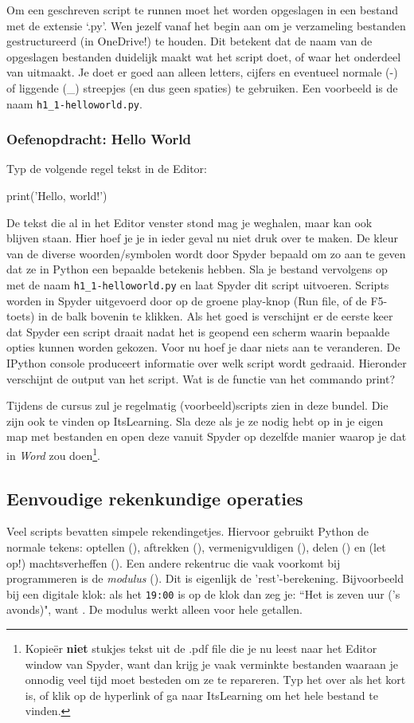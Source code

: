 \documentclass[a4paper,11pt, fleqn]{article}
\begin{document}
Om een geschreven script te runnen moet het worden opgeslagen in een bestand met de extensie `.py'. Wen jezelf vanaf het begin aan om je verzameling bestanden gestructureerd (in OneDrive!) te houden. Dit betekent dat de naam van de opgeslagen bestanden duidelijk maakt wat het script doet, of waar het onderdeel van uitmaakt. Je doet er goed aan alleen letters, cijfers en eventueel normale (-) of liggende (\_) streepjes (en dus geen spaties) te gebruiken. Een voorbeeld is de naam \verb,h1_1-helloworld.py,.

\subsubsection*{Oefenopdracht: Hello World} 
Typ de volgende regel tekst in de Editor: 
\begin{python}
print('Hello, world!')
\end{python}
De tekst die al in het Editor venster stond mag je weghalen, maar kan ook blijven staan. Hier hoef je je in ieder geval nu niet druk over te maken. De kleur van de diverse woorden/symbolen wordt door Spyder bepaald om zo aan te geven dat ze in Python een bepaalde betekenis hebben.
Sla je bestand vervolgens op met de naam \verb,h1_1-helloworld.py, en laat Spyder dit script uitvoeren. 
Scripts worden in Spyder uitgevoerd door op de groene play-knop (Run file, of de F5-toets) in de balk bovenin te klikken.
Als het goed is verschijnt er de eerste keer dat Spyder een script draait nadat het is geopend een scherm waarin bepaalde opties kunnen worden gekozen. Voor nu hoef je daar niets aan te veranderen. De IPython console produceert informatie over welk script wordt gedraaid. Hieronder verschijnt de output van het script. 
Wat is de functie van het commando print?

Tijdens de cursus zul je regelmatig (voorbeeld)scripts zien in deze bundel. Die zijn ook te vinden op ItsLearning. 
Sla deze als je ze nodig hebt op in je eigen map met bestanden en open deze vanuit Spyder op dezelfde manier waarop je dat in \textit{Word} zou doen\footnote{Kopie\"{e}r \textbf{niet} stukjes tekst uit de .pdf file die je nu leest naar het Editor window van Spyder, want dan krijg je vaak verminkte bestanden waaraan je onnodig veel tijd moet besteden om ze te repareren. Typ het over als het kort is, of klik op de hyperlink of ga naar ItsLearning om het hele bestand te vinden.}.

\subsection{Eenvoudige rekenkundige operaties}
Veel scripts bevatten simpele rekendingetjes. Hiervoor gebruikt Python de normale tekens: optellen (\pythoninline{+}), aftrekken (\pythoninline{-}), vermenigvuldigen (\pythoninline{*}), delen (\pythoninline{/}) en (let op!) machtsverheffen (\pythoninline{**}). Een andere rekentruc die vaak voorkomt bij programmeren is de \textit{modulus} (\pythoninline{\%}). Dit is eigenlijk de 'rest'-berekening. Bijvoorbeeld bij een digitale klok: als het \verb,19:00, is op de klok dan zeg je: ``Het is zeven uur ('s avonds)", want . De modulus werkt alleen voor hele getallen.
\end{document}
